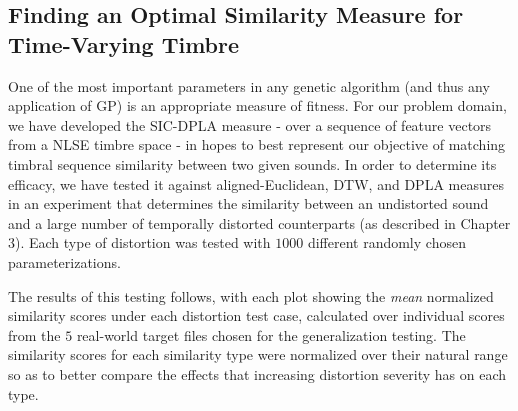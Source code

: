 \documentclass[a4paper,12pt]{report} 	%
\numberwithin{figure}{chapter}
\numberwithin{table}{chapter}
\numberwithin{equation}{chapter}
\begin{document}
\begin{flushleft}
\section{Finding an Optimal Similarity Measure for Time-Varying Timbre}
One of the most important parameters in any genetic algorithm (and thus any application of GP) is an appropriate measure of fitness. For our problem domain, we have developed the SIC-DPLA measure - over a sequence of feature vectors from a NLSE timbre space - in hopes to best represent our objective of matching timbral sequence similarity between two given sounds. In order to determine its efficacy, we have tested it against aligned-Euclidean, DTW, and DPLA measures in an experiment that determines the similarity between an undistorted sound and a large number of temporally distorted counterparts (as described in Chapter 3). Each type of distortion was tested with $1000$ different randomly chosen parameterizations.

The results of this testing follows, with each plot showing the \textit{mean} normalized similarity scores under each distortion test case, calculated over individual scores from the $5$ real-world target files chosen for the generalization testing. The similarity scores for each similarity type were normalized over their natural range so as to better compare the effects that increasing distortion severity has on each type.


\end{flushleft}
\end{document}
